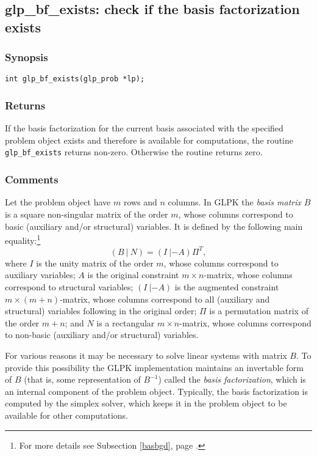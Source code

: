 \subsection{glp\_bf\_exists: check if the basis factorization exists}

\subsubsection*{Synopsis}

\begin{verbatim}
int glp_bf_exists(glp_prob *lp);
\end{verbatim}

\subsubsection*{Returns}

If the basis factorization for the current basis associated with the
specified problem object exists and therefore is available for
computations, the routine \verb|glp_bf_exists| returns non-zero.
Otherwise the routine returns zero.

\subsubsection*{Comments}

Let the problem object have $m$ rows and $n$ columns. In GLPK the
{\it basis matrix} $B$ is a square non-singular matrix of the order $m$,
whose columns correspond to basic (auxiliary and/or structural)
variables. It is defined by the following main
equality:\footnote{For more details see Subsection \ref{basbgd},
page \pageref{basbgd}.}
$$(B\ |\ N)=(I\ |-\!A)\Pi^T,$$
where $I$ is the unity matrix of the order $m$, whose columns correspond
to auxiliary variables; $A$ is the original constraint
$m\times n$-matrix, whose columns correspond to structural variables;
$(I\ |-\!A)$ is the augmented constraint\linebreak
$m\times(m+n)$-matrix, whose columns correspond to all (auxiliary and
structural) variables following in the original order; $\Pi$ is a
permutation matrix of the order $m+n$; and $N$ is a rectangular
$m\times n$-matrix, whose columns correspond to non-basic (auxiliary
and/or structural) variables.

For various reasons it may be necessary to solve linear systems with
matrix $B$. To provide this possibility the GLPK implementation
maintains an invertable form of $B$ (that is, some representation of
$B^{-1}$) called the {\it basis factorization}, which is an internal
component of the problem object. Typically, the basis factorization is
computed by the simplex solver, which keeps it in the problem object
to be available for other computations.

